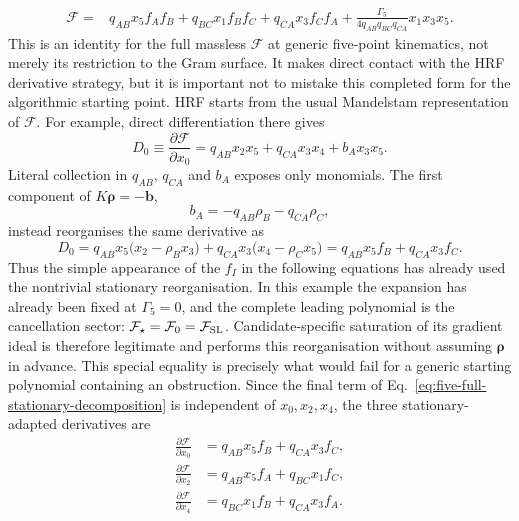 \documentclass[a4paper,11pt]{article}
\newcommand{\FSL}{\mathcal F_{\rm SL}}
\begin{document}
\begin{align}
 \mathcal F={}&q_{AB}x_5f_Af_B+q_{BC}x_1f_Bf_C
 +q_{CA}x_3f_Cf_A
 +\frac{\Gamma_5}{4q_{AB}q_{BC}q_{CA}}x_1x_3x_5.
 \label{eq:five-full-stationary-decomposition}
\end{align}
This is an identity for the full massless \(\mathcal F\) at generic
five-point kinematics, not merely its restriction to the Gram surface.  It
makes direct contact with the HRF derivative strategy, but it is important
not to mistake this completed form for the algorithmic starting point.  HRF
starts from the usual Mandelstam representation of \(\mathcal F\).  For
example, direct differentiation there gives
\begin{equation}
 D_0\equiv\frac{\partial\mathcal F}{\partial x_0}
 =q_{AB}x_2x_5+q_{CA}x_3x_4+b_Ax_3x_5.
 \label{eq:five-raw-D0}
\end{equation}
Literal collection in \(q_{AB}\), \(q_{CA}\) and \(b_A\) exposes only
monomials.  The first component of \(K\boldsymbol\rho=-\boldsymbol b\),
\begin{equation}
 b_A=-q_{AB}\rho_B-q_{CA}\rho_C,
\end{equation}
instead reorganises the same derivative as
\begin{equation}
 D_0=q_{AB}x_5\bigl(x_2-\rho_Bx_3\bigr)
     +q_{CA}x_3\bigl(x_4-\rho_Cx_5\bigr)
 =q_{AB}x_5f_B+q_{CA}x_3f_C.
 \label{eq:five-adapted-D0}
\end{equation}
Thus the simple appearance of the \(f_I\) in the following equations has
already used the nontrivial stationary reorganisation.  In this example the
expansion has already been fixed at \(\Gamma_5=0\), and the complete leading
polynomial is the cancellation sector: \(\mathcal F_\star=\mathcal F_0=
\FSL\).  Candidate-specific saturation of its gradient ideal is therefore
legitimate and performs this reorganisation without assuming
\(\boldsymbol\rho\) in advance.  This special equality is precisely what
would fail for a generic starting polynomial containing an obstruction.
Since the final term of
Eq.~\eqref{eq:five-full-stationary-decomposition} is independent of
\(x_0,x_2,x_4\), the three stationary-adapted derivatives are
\begin{align}
 \frac{\partial\mathcal F}{\partial x_0}
 &=q_{AB}x_5f_B+q_{CA}x_3f_C,\nonumber\\
 \frac{\partial\mathcal F}{\partial x_2}
 &=q_{AB}x_5f_A+q_{BC}x_1f_C,\nonumber\\
 \frac{\partial\mathcal F}{\partial x_4}
 &=q_{BC}x_1f_B+q_{CA}x_3f_A.
 \label{eq:five-near-planar-gradient-system}
\end{align}
\end{document}
